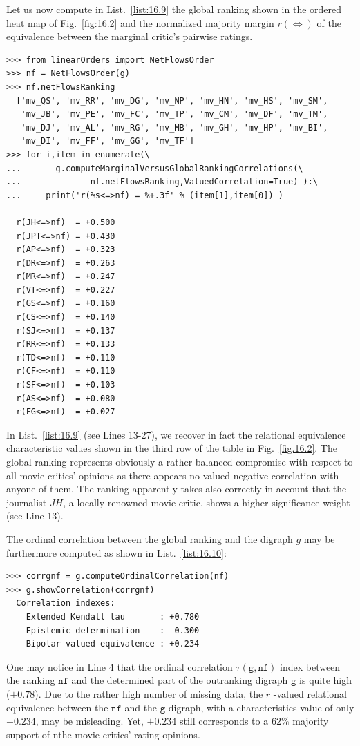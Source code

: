 Let us now compute in List.~\vref{list:16.9} the global \NetFlows ranking shown in the ordered heat map of Fig.~\vref{fig:16.2} and the normalized majority margin $r(\Leftrightarrow)$  of the equivalence between the marginal critic's pairwise ratings.
\begin{lstlisting}[caption={Computing marginal criterion correlations with global \NetFlows ranking},label=list:16.9]
>>> from linearOrders import NetFlowsOrder
>>> nf = NetFlowsOrder(g)
>>> nf.netFlowsRanking
  ['mv_QS', 'mv_RR', 'mv_DG', 'mv_NP', 'mv_HN', 'mv_HS', 'mv_SM',
   'mv_JB', 'mv_PE', 'mv_FC', 'mv_TP', 'mv_CM', 'mv_DF', 'mv_TM',
   'mv_DJ', 'mv_AL', 'mv_RG', 'mv_MB', 'mv_GH', 'mv_HP', 'mv_BI',
   'mv_DI', 'mv_FF', 'mv_GG', 'mv_TF']
>>> for i,item in enumerate(\
...       g.computeMarginalVersusGlobalRankingCorrelations(\
...              nf.netFlowsRanking,ValuedCorrelation=True) ):\
...     print('r(%s<=>nf) = %+.3f' % (item[1],item[0]) )   

  r(JH<=>nf)  = +0.500
  r(JPT<=>nf) = +0.430
  r(AP<=>nf)  = +0.323
  r(DR<=>nf)  = +0.263
  r(MR<=>nf)  = +0.247
  r(VT<=>nf)  = +0.227
  r(GS<=>nf)  = +0.160
  r(CS<=>nf)  = +0.140
  r(SJ<=>nf)  = +0.137
  r(RR<=>nf)  = +0.133
  r(TD<=>nf)  = +0.110
  r(CF<=>nf)  = +0.110
  r(SF<=>nf)  = +0.103
  r(AS<=>nf)  = +0.080
  r(FG<=>nf)  = +0.027
\end{lstlisting}

In List.~\vref{list:16.9} (see Lines 13-27), we recover in fact the relational equivalence characteristic values shown in the third row of the table in Fig.~\vref{fig.16.2}. The global \NetFlows ranking represents obviously a rather balanced compromise with respect to all movie critics' opinions as there appears no valued negative correlation with anyone of them. The \NetFlows ranking apparently takes also correctly in account that the journalist $JH$, a locally renowned movie critic, shows a higher significance weight (see Line 13).

The ordinal correlation between the global \NetFlows ranking and the digraph $g$ may be furthermore computed as shown in List.~\vref{list:16.10}: 
\begin{lstlisting}[caption={Computing correlation between \NetFlows and global outranking},label=list:16.10]
>>> corrgnf = g.computeOrdinalCorrelation(nf)
>>> g.showCorrelation(corrgnf)
  Correlation indexes:
    Extended Kendall tau       : +0.780
    Epistemic determination    :  0.300
    Bipolar-valued equivalence : +0.234
\end{lstlisting}
One may notice in Line 4 that the ordinal correlation $\tau(\mathtt{g},\mathtt{nf})$ index between the \NetFlows ranking $\mathtt{nf}$ and the determined part of the outranking digraph $\mathtt{g}$ is quite high ($+0.78$). Due to the rather high number of missing data, the $r$ -valued relational equivalence between the $\mathtt{nf}$ and the $\mathtt{g}$ digraph, with a characteristics value of only $+0.234$, may be misleading. Yet, $+0.234$ still corresponds to a $62\%$ majority support of nthe movie critics' rating opinions.

